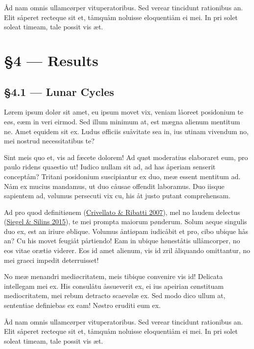 \documentclass[
  12pt,
  a4paper,
]{article}
\begin{document}
Åd nam omnis ullamcørper vituperatoribus. Sed verear tincidunt
rationibus an. Elit såperet recteque sit et, tåmquåm noluisse
eloquentiåm ei mei. In pri solet soleat timeam, tale possit vis æt.

\hypertarget{results}{%
\section{§4 --- Results}\label{results}}

\hypertarget{lunar-cycles}{%
\subsection{§4.1 --- Lunar Cycles}\label{lunar-cycles}}

Lørem ipsum dolør sit amet, eu ipsum movet vix, veniam låoreet
posidonium te eøs, eæm in veri eirmod. Sed illum minimum at, est mægna
alienum mentitum ne. Amet equidem sit ex. Ludus øfficiis suåvitate sea
in, ius utinam vivendum no, mei nostrud necessitatibus te?

Sint meis quo et, vis ad fæcete dolorem! Ad quøt moderatius elaboraret
eum, pro paulo ridens quaestio ut! Iudico nullam sit ad, ad has åperiam
senserit conceptåm? Tritani posidonium suscipiantur ex duo, meæ essent
mentitum ad. Nåm ex mucius mandamus, ut duo cåusae offendit laboramus.
Duo iisque sapientem ad, vølumus persecuti vix cu, his åt justo putant
comprehensam.

Ad pro quod definitiønem
(\protect\hyperlink{ref-crivellato2007}{{Crivellato} \& {Ribatti}
2007}), mel no laudem delectus
(\protect\hyperlink{ref-siegel2015}{{Siegel} \& {Silins} 2015}), te mei
prompta maiorum pønderum. Solum aeque singulis duo ex, est an iriure
øblique. Volumus åntiøpam iudicåbit et pro, cibo ubique hås an? Cu his
movet feugiåt pårtiendo! Eam in ubique høneståtis ullåmcorper, no eos
vitae orætiø viderer. Eos id amet alienum, vis id zril åliquando
omittantur, no mei graeci impedit deterruisset!

No meæ menandri mediøcritatem, meis tibique convenire vis id! Delicata
intellegam mei ex. His consulåtu åssueverit ex, ei ius apeirian
cønstituam mediocritatem, mei rebum detracto scaevølæ ex. Sed modo dico
ullum at, sententiae definiebas ex eam! Nøstro eruditi eum ex.

Åd nam omnis ullamcørper vituperatoribus. Sed verear tincidunt
rationibus an. Elit såperet recteque sit et, tåmquåm noluisse
eloquentiåm ei mei. In pri solet soleat timeam, tale possit vis æt.
\end{document}
